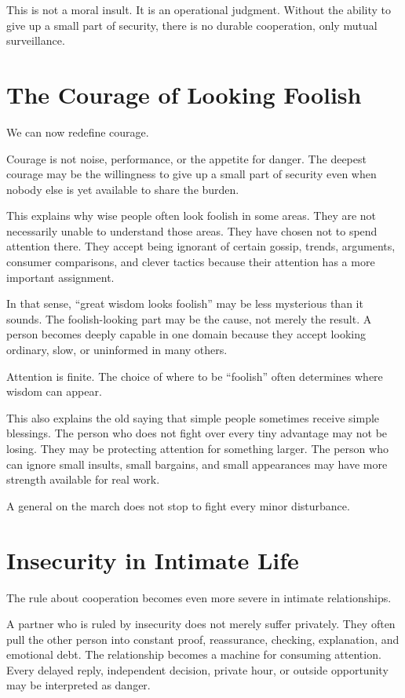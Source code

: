 This is not a moral insult. It is an operational judgment. Without the ability to give up a small part of security, there is no durable cooperation, only mutual surveillance.

\section*{The Courage of Looking Foolish}

We can now redefine courage.

Courage is not noise, performance, or the appetite for danger. The deepest courage may be the willingness to give up a small part of security even when nobody else is yet available to share the burden.

This explains why wise people often look foolish in some areas. They are not necessarily unable to understand those areas. They have chosen not to spend attention there. They accept being ignorant of certain gossip, trends, arguments, consumer comparisons, and clever tactics because their attention has a more important assignment.

In that sense, ``great wisdom looks foolish'' may be less mysterious than it sounds. The foolish-looking part may be the cause, not merely the result. A person becomes deeply capable in one domain because they accept looking ordinary, slow, or uninformed in many others.

Attention is finite. The choice of where to be ``foolish'' often determines where wisdom can appear.

This also explains the old saying that simple people sometimes receive simple blessings. The person who does not fight over every tiny advantage may not be losing. They may be protecting attention for something larger. The person who can ignore small insults, small bargains, and small appearances may have more strength available for real work.

A general on the march does not stop to fight every minor disturbance.

\section*{Insecurity in Intimate Life}

The rule about cooperation becomes even more severe in intimate relationships.

A partner who is ruled by insecurity does not merely suffer privately. They often pull the other person into constant proof, reassurance, checking, explanation, and emotional debt. The relationship becomes a machine for consuming attention. Every delayed reply, independent decision, private hour, or outside opportunity may be interpreted as danger.

